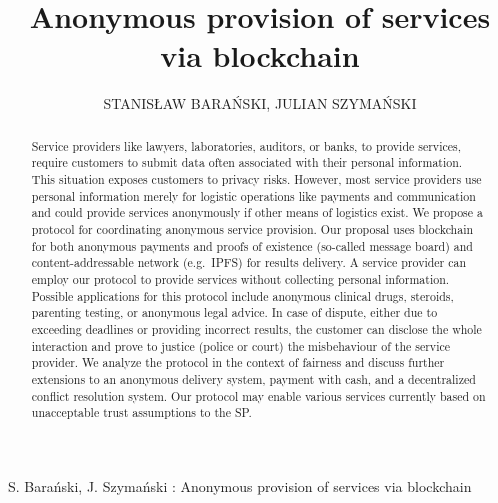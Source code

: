 \documentclass{ieeeaccess}
\begin{document}

\title{Anonymous provision of services via blockchain}
\author{\uppercase{Stanis\l{}aw Bara{\'n}ski},
\uppercase{Julian Szyma{\'n}ski } 
 }

\address[1]{Department of Electronic, Telecommunication and Informatics, Gdansk University of Technology, Narutowicza 11/12 Gdansk Poland (e-mail: stanislaw.baranski@pg.edu.pl, julian.szymanski@eti.pg.edu.pl}

 


{S. Bara{\'n}ski, J. Szyma{\'n}ski : 
Anonymous provision of services via blockchain}


\begin{abstract}
Service providers like lawyers, laboratories, auditors, or banks, to provide services, require customers to submit data often associated with their personal information. This situation exposes customers to privacy risks. However, most service providers use personal information merely for logistic operations like payments and communication and could provide services anonymously if other means of logistics exist.
We propose a protocol for coordinating anonymous service provision. Our proposal uses blockchain for both anonymous payments and proofs of existence (so-called message board) and content-addressable network (e.g.~IPFS) for results delivery.
A service provider can employ our protocol to provide services without collecting personal information. Possible applications for this protocol include anonymous clinical drugs, steroids, parenting testing, or anonymous legal advice.
In case of dispute, either due to exceeding deadlines or providing incorrect results, the customer can disclose the whole interaction and prove to justice (police or court) the misbehaviour of the service provider.
We analyze the protocol in the context of fairness and discuss further extensions to an anonymous delivery system, payment with cash, and a decentralized conflict resolution system.
Our protocol may enable various services currently based on unacceptable trust assumptions to the SP.
\end{abstract}
\end{document}
